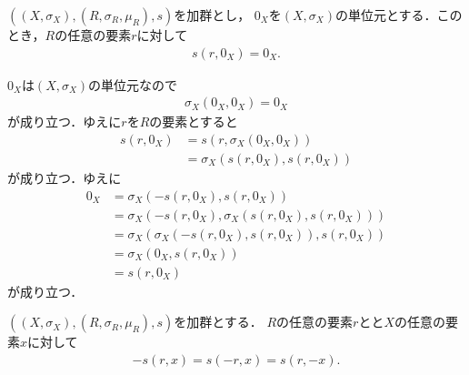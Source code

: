 	\begin{screen}
		\begin{thm}[ゼロには何を掛けてもゼロ]\label{thm:zero_multiplied_is_zero}
			$\left((X,\sigma_X),(R,\sigma_R,\mu_R),s\right)$を加群とし，
			$0_X$を$(X,\sigma_X)$の単位元とする．このとき，$R$の任意の要素$r$に対して
			\begin{align}
				s\left(r,0_X\right) = 0_X.
			\end{align}
		\end{thm}
	\end{screen}
	
	\begin{sketch}
		$0_X$は$(X,\sigma_X)$の単位元なので
		\begin{align}
			\sigma_X\left(0_X,0_X\right) = 0_X
		\end{align}
		が成り立つ．ゆえに$r$を$R$の要素とすると
		\begin{align}
			s\left(r,0_X\right) &= s\left(r,\sigma_X\left(0_X,0_X\right)\right) \\
			&= \sigma_X\left(s\left(r,0_X\right),s\left(r,0_X\right)\right)
		\end{align}
		が成り立つ．ゆえに
		\begin{align}
			0_X &= \sigma_X\left(-s\left(r,0_X\right),s\left(r,0_X\right)\right) \\
			&= \sigma_X\left(-s\left(r,0_X\right),\sigma_X\left(s\left(r,0_X\right),s\left(r,0_X\right)\right)\right) \\
			&= \sigma_X\left(\sigma_X\left(-s\left(r,0_X\right),s\left(r,0_X\right)\right),s\left(r,0_X\right)\right) \\
			&= \sigma_X\left(0_X,s\left(r,0_X\right)\right) \\
			&= s\left(r,0_X\right)
		\end{align}
		が成り立つ．
		\QED
	\end{sketch}
	
	\begin{screen}
		\begin{thm}\label{thm:inverse_element_equals_to_its_minus}
			$\left((X,\sigma_X),(R,\sigma_R,\mu_R),s\right)$を加群とする．
			$R$の任意の要素$r$と$とX$の任意の要素$x$に対して
			\begin{align}
				-s(r,x) = s(-r,x) = s(r,-x).
			\end{align}
		\end{thm}
	\end{screen}
	
